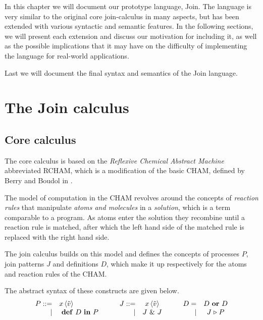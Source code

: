 
In this chapter we will document our prototype language, Join.  The
language is very similar to the original core join-calculus in many
aspects, but has been extended with various syntactic and semantic
features. In the following sections, we will present each extension
and discuss our motivation for including it, as well as the possible
implications that it may have on the difficulty of implementing the
language for real-world applications.

Last we will document the final syntax and semantics of the Join
language.

\section{The Join calculus}


\subsection{Core calculus}

The core calculus is based on the \emph{Reflexive Chemical Abstract Machine}
abbreviated RCHAM, which is a modification of the basic CHAM, defined by Berry
and Boudol in \cite{berry1989chemical}.

The model of computation in the CHAM revolves around the concepts of
\emph{reaction rules} that manipulate \emph{atoms and molecules} in a
\emph{solution}, which is a term comparable to a program. As atoms enter the
solution they recombine until a reaction rule is matched, after which the left
hand side of the matched rule is replaced with the right hand side.

The join calculus builds on this model and defines the concepts of processes
$P$, join patterns $J$ and definitions $D$, which make it up respectively for
the atoms and reaction rules of the CHAM.

The abstract syntax of these constructs are given below.
\begin{displaymath}
\begin{array}{rl}
  P ::=& \atm x < \tilde v > \\
 |& \defJ D \inJ P
\end{array}\qquad
\begin{array}{rc}
  J ::=& \atm x < \tilde v > \\
 |& J \andJ J
\end{array}\qquad
\begin{array}{rc}
  D =& D \orJ D \\
 |& J \toJ{} P
\end{array}
\end{displaymath}

